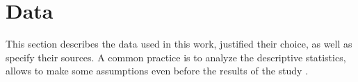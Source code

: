 \section{Data}
\label{sec:Data}

This section describes the data used in this work, justified their choice, as well as specify their sources. A common practice is to analyze the descriptive statistics, allows to make some assumptions even before the results of the study \citet{sundmanOpenCalphadFreeThermodynamic2015}.
